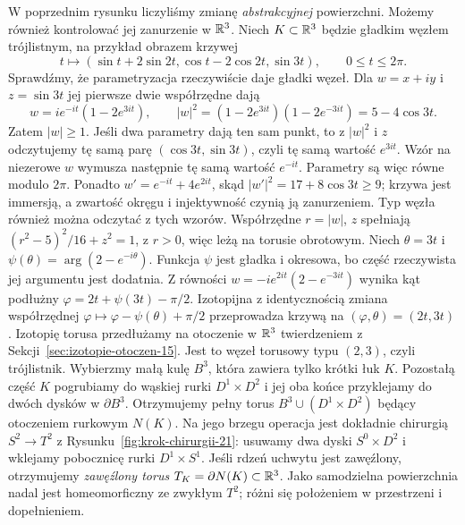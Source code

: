 \begin{przyklad}
\label{prz:knotted-torus-surgery-21}
W poprzednim rysunku liczyliśmy zmianę
\emph{abstrakcyjnej} powierzchni. Możemy
również kontrolować jej zanurzenie w $\mathbb{R}^3$.
Niech $K\subset\mathbb{R}^3$ będzie gładkim węzłem
trójlistnym, na przykład obrazem krzywej
\[
 t\longmapsto(\sin t+2\sin2t,
 \cos t-2\cos2t,\sin3t),
 \qquad 0\leq t\leq2\pi.
\]
Sprawdźmy, że parametryzacja rzeczywiście daje gładki węzeł.
Dla $w=x+iy$ i $z=\sin3t$ jej pierwsze dwie współrzędne dają
\[
 w=i e^{-it}(1-2e^{3it}),\qquad
 |w|^2=(1-2e^{3it})(1-2e^{-3it})=5-4\cos3t.
\]
Zatem $|w|\geq1$. Jeśli dwa parametry dają ten sam punkt,
to z $|w|^2$ i $z$ odczytujemy tę samą parę
$(\cos3t,\sin3t)$, czyli tę samą wartość $e^{3it}$.
Wzór na niezerowe $w$ wymusza następnie tę samą wartość
$e^{-it}$. Parametry są więc równe modulo $2\pi$.
Ponadto $w'=e^{-it}+4e^{2it}$, skąd
$|w'|^2=17+8\cos3t\geq9$; krzywa jest immersją,
a zwartość okręgu i injektywność czynią ją zanurzeniem.
Typ węzła również można odczytać z tych wzorów.
Współrzędne $r=|w|$, $z$ spełniają
$(r^2-5)^2/16+z^2=1$, z $r>0$, więc leżą na torusie obrotowym.
Niech $\theta=3t$ i $\psi(\theta)=\arg(2-e^{-i\theta})$.
Funkcja $\psi$ jest gładka i okresowa, bo część rzeczywista
jej argumentu jest dodatnia. Z równości
$w=-i e^{2it}(2-e^{-3it})$ wynika kąt podłużny
$\varphi=2t+\psi(3t)-\pi/2$.
Izotopijna z identycznością zmiana współrzędnej
$\varphi\mapsto\varphi-\psi(\theta)+\pi/2$
przeprowadza krzywą na $(\varphi,\theta)=(2t,3t)$.
Izotopię torusa przedłużamy na otoczenie w $\mathbb{R}^3$
twierdzeniem z Sekcji~\ref{sec:izotopie-otoczen-15}.
Jest to węzeł torusowy typu $(2,3)$, czyli trójlistnik.
Wybierzmy małą kulę $B^3$, która zawiera
tylko krótki łuk $K$. Pozostałą część $K$
pogrubiamy do wąskiej rurki $D^1\times D^2$
i jej oba końce przyklejamy do dwóch dysków
w $\partial B^3$. Otrzymujemy pełny torus
$B^3\cup(D^1\times D^2)$ będący otoczeniem
rurkowym $N(K)$. Na jego brzegu operacja jest
dokładnie chirurgią $S^2\to T^2$ z
Rysunku~\ref{fig:krok-chirurgii-21}:
usuwamy dwa dyski $S^0\times D^2$
i wklejamy pobocznicę rurki $D^1\times S^1$.
Jeśli rdzeń uchwytu jest zawęźlony,
otrzymujemy \emph{zawęźlony torus}
$T_K=\partial N(K)\subset\mathbb{R}^3$.
Jako samodzielna powierzchnia nadal jest
homeomorficzny ze zwykłym $T^2$; różni się
położeniem w przestrzeni i dopełnieniem.


\end{przyklad}
